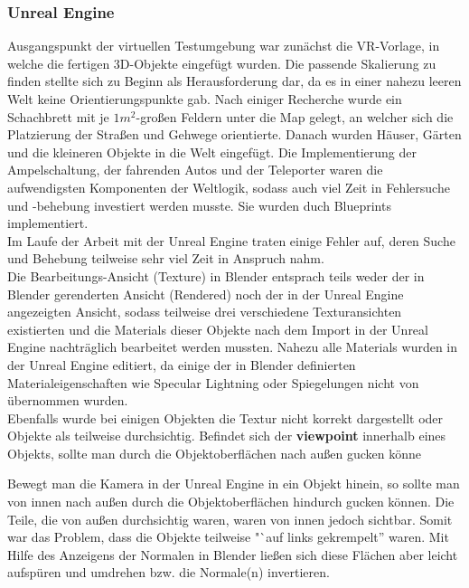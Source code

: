 \documentclass{Bericht}
\begin{document}
\subsubsection{Unreal Engine}
Ausgangspunkt der virtuellen Testumgebung war zunächst die VR-Vorlage, in welche die fertigen 3D-Objekte eingefügt wurden. Die passende Skalierung zu finden stellte sich zu Beginn als Herausforderung dar, da es in einer nahezu leeren Welt keine Orientierungspunkte gab. Nach einiger Recherche wurde ein Schachbrett mit je $1m^{2}$-großen Feldern unter die Map gelegt, an welcher sich die Platzierung der Straßen und Gehwege orientierte. Danach wurden Häuser, Gärten und die kleineren Objekte in die Welt eingefügt.
Die Implementierung der Ampelschaltung, der fahrenden Autos und der Teleporter waren die aufwendigsten Komponenten der Weltlogik, sodass auch viel Zeit in Fehlersuche und -behebung investiert werden musste. Sie wurden duch Blueprints implementiert.\\
				Im Laufe der Arbeit mit der Unreal Engine traten einige Fehler auf, deren Suche und Behebung teilweise sehr viel Zeit in Anspruch nahm.\\
Die Bearbeitungs-Ansicht (Texture) in Blender entsprach teils weder der in Blender gerenderten Ansicht (Rendered) noch der in der Unreal Engine angezeigten Ansicht, sodass teilweise drei verschiedene Texturansichten existierten und die Materials dieser Objekte nach dem Import in der Unreal Engine nachträglich bearbeitet werden mussten. Nahezu alle Materials wurden in der Unreal Engine editiert, da einige der in Blender definierten  Materialeigenschaften wie Specular Lightning oder Spiegelungen nicht von übernommen wurden.\\

			Ebenfalls wurde bei einigen Objekten die Textur nicht korrekt dargestellt oder Objekte als teilweise durchsichtig. Befindet sich der \textbf{viewpoint} innerhalb eines Objekts, sollte man durch die Objektoberflächen nach außen gucken könne
			
			 Bewegt man die Kamera in der Unreal Engine in ein Objekt hinein, so sollte man von innen nach außen durch die Objektoberflächen hindurch gucken können. 
			Die Teile, die von außen durchsichtig waren, waren von innen jedoch sichtbar. Somit war das Problem, dass die Objekte teilweise "`auf links gekrempelt'' waren. Mit Hilfe des Anzeigens der Normalen in Blender ließen sich diese Flächen aber leicht aufspüren und umdrehen bzw. die Normale(n) invertieren.
\end{document}
